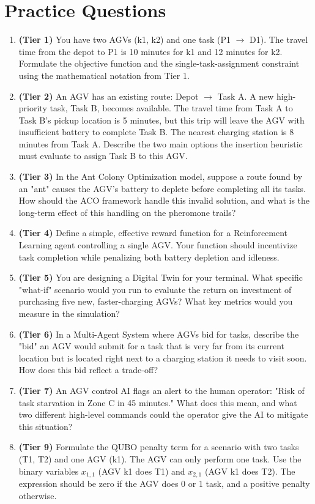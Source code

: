 \documentclass{article}
\begin{document}
\newpage
\section*{Practice Questions}
\begin{enumerate}
    \item \textbf{(Tier 1)} You have two AGVs (k1, k2) and one task (P1 $\to$ D1). The travel time from the depot to P1 is 10 minutes for k1 and 12 minutes for k2. Formulate the objective function and the single-task-assignment constraint using the mathematical notation from Tier 1.
    
    \item \textbf{(Tier 2)} An AGV has an existing route: Depot $\to$ Task A. A new high-priority task, Task B, becomes available. The travel time from Task A to Task B's pickup location is 5 minutes, but this trip will leave the AGV with insufficient battery to complete Task B. The nearest charging station is 8 minutes from Task A. Describe the two main options the insertion heuristic must evaluate to assign Task B to this AGV.
    
    \item \textbf{(Tier 3)} In the Ant Colony Optimization model, suppose a route found by an "ant" causes the AGV's battery to deplete before completing all its tasks. How should the ACO framework handle this invalid solution, and what is the long-term effect of this handling on the pheromone trails?

    \item \textbf{(Tier 4)} Define a simple, effective reward function for a Reinforcement Learning agent controlling a single AGV. Your function should incentivize task completion while penalizing both battery depletion and idleness.
    
    \item \textbf{(Tier 5)} You are designing a Digital Twin for your terminal. What specific "what-if" scenario would you run to evaluate the return on investment of purchasing five new, faster-charging AGVs? What key metrics would you measure in the simulation?
    
    \item \textbf{(Tier 6)} In a Multi-Agent System where AGVs bid for tasks, describe the "bid" an AGV would submit for a task that is very far from its current location but is located right next to a charging station it needs to visit soon. How does this bid reflect a trade-off?

    \item \textbf{(Tier 7)} An AGV control AI flags an alert to the human operator: "Risk of task starvation in Zone C in 45 minutes." What does this mean, and what two different high-level commands could the operator give the AI to mitigate this situation?

    \item \textbf{(Tier 9)} Formulate the QUBO penalty term for a scenario with two tasks (T1, T2) and one AGV (k1). The AGV can only perform one task. Use the binary variables $x_{1,1}$ (AGV k1 does T1) and $x_{2,1}$ (AGV k1 does T2). The expression should be zero if the AGV does 0 or 1 task, and a positive penalty otherwise.

\end{enumerate}
\end{document}

